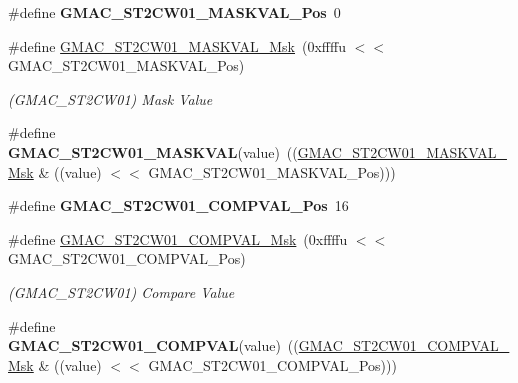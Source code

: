 \begin{DoxyCompactItemize}
\#define {\bfseries G\+M\+A\+C\+\_\+\+S\+T2\+C\+W01\+\_\+\+M\+A\+S\+K\+V\+A\+L\+\_\+\+Pos}~0
\item 
\mbox{\label{group__SAME70__GMAC_gae68ea9a608305910c8556aa49821bd21}} 
\#define \mbox{\hyperlink{group__SAME70__GMAC_gae68ea9a608305910c8556aa49821bd21}{G\+M\+A\+C\+\_\+\+S\+T2\+C\+W01\+\_\+\+M\+A\+S\+K\+V\+A\+L\+\_\+\+Msk}}~(0xffffu $<$$<$ G\+M\+A\+C\+\_\+\+S\+T2\+C\+W01\+\_\+\+M\+A\+S\+K\+V\+A\+L\+\_\+\+Pos)
\begin{DoxyCompactList}\small\item\em (G\+M\+A\+C\+\_\+\+S\+T2\+C\+W01) Mask Value \end{DoxyCompactList}\item 
\mbox{\label{group__SAME70__GMAC_ga35e3b6fc554359b8b2d90e98f84ef1ae}} 
\#define {\bfseries G\+M\+A\+C\+\_\+\+S\+T2\+C\+W01\+\_\+\+M\+A\+S\+K\+V\+AL}(value)~((\mbox{\hyperlink{group__SAMV71__GMAC_gae68ea9a608305910c8556aa49821bd21}{G\+M\+A\+C\+\_\+\+S\+T2\+C\+W01\+\_\+\+M\+A\+S\+K\+V\+A\+L\+\_\+\+Msk}} \& ((value) $<$$<$ G\+M\+A\+C\+\_\+\+S\+T2\+C\+W01\+\_\+\+M\+A\+S\+K\+V\+A\+L\+\_\+\+Pos)))
\item 
\mbox{\label{group__SAME70__GMAC_ga8fbe36dde5accb4c0df82392e741e721}} 
\#define {\bfseries G\+M\+A\+C\+\_\+\+S\+T2\+C\+W01\+\_\+\+C\+O\+M\+P\+V\+A\+L\+\_\+\+Pos}~16
\item 
\mbox{\label{group__SAME70__GMAC_ga48da0813af6c13560c0e071608f4d6ff}} 
\#define \mbox{\hyperlink{group__SAME70__GMAC_ga48da0813af6c13560c0e071608f4d6ff}{G\+M\+A\+C\+\_\+\+S\+T2\+C\+W01\+\_\+\+C\+O\+M\+P\+V\+A\+L\+\_\+\+Msk}}~(0xffffu $<$$<$ G\+M\+A\+C\+\_\+\+S\+T2\+C\+W01\+\_\+\+C\+O\+M\+P\+V\+A\+L\+\_\+\+Pos)
\begin{DoxyCompactList}\small\item\em (G\+M\+A\+C\+\_\+\+S\+T2\+C\+W01) Compare Value \end{DoxyCompactList}\item 
\mbox{\label{group__SAME70__GMAC_gac018dc960294897cce619657bb4ca98b}} 
\#define {\bfseries G\+M\+A\+C\+\_\+\+S\+T2\+C\+W01\+\_\+\+C\+O\+M\+P\+V\+AL}(value)~((\mbox{\hyperlink{group__SAMV71__GMAC_ga48da0813af6c13560c0e071608f4d6ff}{G\+M\+A\+C\+\_\+\+S\+T2\+C\+W01\+\_\+\+C\+O\+M\+P\+V\+A\+L\+\_\+\+Msk}} \& ((value) $<$$<$ G\+M\+A\+C\+\_\+\+S\+T2\+C\+W01\+\_\+\+C\+O\+M\+P\+V\+A\+L\+\_\+\+Pos)))

\end{DoxyCompactItemize}
